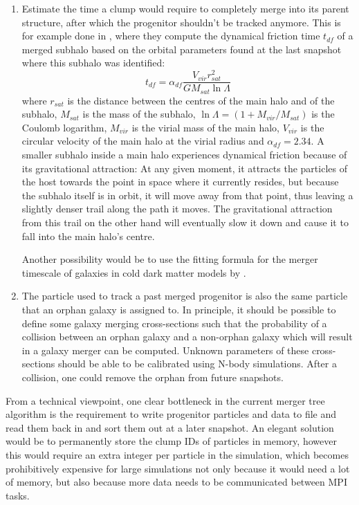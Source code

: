 \begin{enumerate}
    \item Estimate the time a clump would require to completely merge into its parent structure, after which the progenitor shouldn't be tracked anymore. This is for example done in \cite{Moster}, where they compute the dynamical friction time $t_{df}$ of a merged subhalo based on the orbital parameters found at the last snapshot where this subhalo was identified:
    \begin{equation}
        t_{df} = \alpha_{df} \frac{V_{vir} r_{sat}^2}{G M_{sat}\ln \Lambda} \label{eq:dynamical_friction_time}
    \end{equation}
    where $r_{sat}$ is the distance between the centres of the main halo and of the subhalo, $M_{sat}$ is the mass of the subhalo, $\ln\Lambda = (1 + M_{vir}/M_{sat})$ is the Coulomb logarithm, $M_{vir}$ is the virial mass of the main halo, $V_{vir}$ is the circular velocity of the main halo at the virial radius and $\alpha_{df} = 2.34$. 
    A smaller subhalo inside a main halo experiences dynamical friction because of its gravitational attraction: 
    At any given moment, it attracts the particles of the host towards the point in space where it currently resides, but because the subhalo itself is in orbit, it will move away from that point, thus leaving a slightly denser trail along the path it moves.
    The gravitational attraction from this trail on the other hand will eventually slow it down and cause it to fall into the main halo's centre.
    
    Another possibility would be to use the fitting formula for the merger timescale of galaxies in cold dark matter models by \cite{merger_timescales}.
    
    
    \item The particle used to track a past merged progenitor is also the same particle that an orphan galaxy is assigned to.
    In principle, it should be possible to define some galaxy merging cross-sections such that the probability of a collision between an orphan galaxy and a non-orphan galaxy which will result in a galaxy merger can be computed.
    Unknown parameters of these cross-sections should be able to be calibrated using N-body simulations.
    After a collision, one could remove the orphan from future snapshots.
\end{enumerate}



From a technical viewpoint, one clear bottleneck in the current merger tree algorithm is the requirement to write progenitor particles and data to file and read them back in and sort them out at a later snapshot.
An elegant solution would be to permanently store the clump IDs of particles in memory, however this would require an extra integer per particle in the simulation, which becomes prohibitively expensive for large simulations not only because it would need a lot of memory, but also because more data needs to be communicated between MPI tasks.

